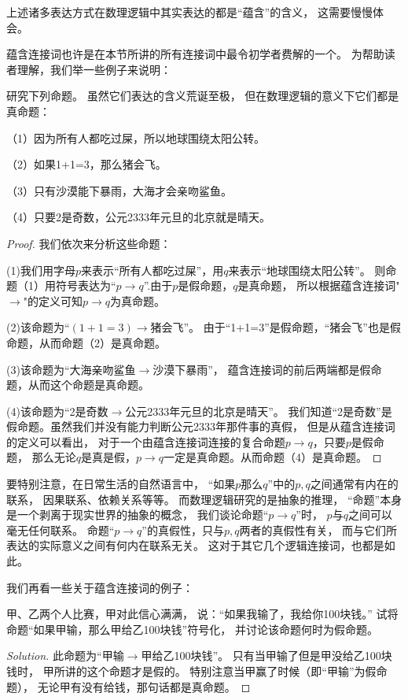 上述诸多表达方式在数理逻辑中其实表达的都是“蕴含”的含义，
这需要慢慢体会。

蕴含连接词也许是在本节所讲的所有连接词中最令初学者费解的一个。
为帮助读者理解，我们举一些例子来说明：

\begin{example}研究下列命题。
虽然它们表达的含义荒诞至极，
但在数理逻辑的意义下它们都是真命题：

（1）因为所有人都吃过屎，所以地球围绕太阳公转。

（2）如果1+1=3，那么猪会飞。

（3）只有沙漠能下暴雨，大海才会亲吻鲨鱼。

（4）只要2是奇数，公元2333年元旦的北京就是晴天。
\end{example}
\begin{proof}
我们依次来分析这些命题：

(1)我们用字母$p$来表示“所有人都吃过屎”，用$q$来表示“地球围绕太阳公转”。
则命题（1）用符号表达为“$p\rightarrow q$”.由于$p$是假命题，$q$是真命题，
所以根据蕴含连接词"$\rightarrow$"的定义可知$p\rightarrow q$为真命题。

(2)该命题为“$(1+1=3)\rightarrow\text{猪会飞}$”。
由于“1+1=3”是假命题，“猪会飞”也是假命题，从而命题（2）是真命题。

(3)该命题为“大海亲吻鲨鱼$\rightarrow$沙漠下暴雨”，
蕴含连接词的前后两端都是假命题，从而这个命题是真命题。

(4)该命题为“2是奇数$\rightarrow$公元2333年元旦的北京是晴天”。
我们知道“2是奇数”是假命题。虽然我们并没有能力判断公元2333年那件事的真假，
但是从蕴含连接词的定义可以看出，
对于一个由蕴含连接词连接的复合命题$p\rightarrow q$，只要$p$是假命题，
那么无论$q$是真是假，$p\rightarrow q$一定是真命题。从而命题（4）是真命题。
\end{proof}

要特别注意，在日常生活的自然语言中，
“如果$p$那么$q$”中的$p,q$之间通常有内在的联系，
因果联系、依赖关系等等。
而数理逻辑研究的是抽象的推理，
“命题”本身是一个剥离于现实世界的抽象的概念，
我们谈论命题“$p\rightarrow q$”时，
$p$与$q$之间可以毫无任何联系。
命题“$p\rightarrow q$”的真假性，只与$p,q$两者的真假性有关，
而与它们所表达的实际意义之间有何内在联系无关。
这对于其它几个逻辑连接词，也都是如此。

我们再看一些关于蕴含连接词的例子：

\begin{example}
甲、乙两个人比赛，甲对此信心满满，
说：“如果我输了，我给你100块钱。”
试将命题“如果甲输，那么甲给乙100块钱”符号化，
并讨论该命题何时为假命题。
\end{example}
\begin{proof}[Solution]
此命题为“甲输$\rightarrow$甲给乙100块钱”。
只有当甲输了但是甲没给乙100块钱时，
甲所讲的这个命题才是假的。
特别注意当甲赢了时候（即“甲输”为假命题），
无论甲有没有给钱，那句话都是真命题。
\end{proof}

